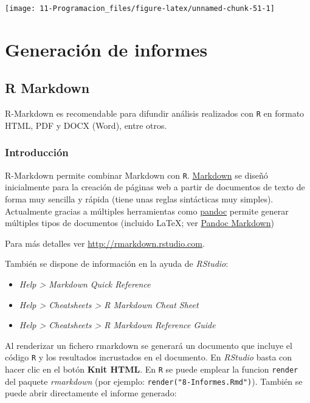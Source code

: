 \documentclass[]{book}
\begin{document}
\begin{center}\texttt{[image: 11-Programacion\_files/figure-latex/unnamed-chunk-51-1]} \end{center}

\hypertarget{generacion-de-informes}{%
\chapter{Generación de informes}\label{generacion-de-informes}}

\hypertarget{r-markdown}{%
\section{R Markdown}\label{r-markdown}}

R-Markdown es recomendable para difundir análisis realizados con \texttt{R} en formato HTML, PDF y DOCX (Word), entre otros.

\hypertarget{introduccion-1}{%
\subsection{Introducción}\label{introduccion-1}}

R-Markdown permite combinar Markdown con \texttt{R}. \href{http://daringfireball.net/projects/markdown/}{Markdown} se diseñó inicialmente para la creación de páginas web a partir de documentos de texto de forma muy sencilla y rápida (tiene unas reglas sintácticas muy simples). Actualmente gracias a múltiples herramientas como \href{http://pandoc.org/}{pandoc} permite generar múltiples tipos de documentos (incluido LaTeX; ver \href{http://rmarkdown.rstudio.com/authoring_pandoc_markdown.html}{Pandoc Markdown})

Para más detalles ver \url{http://rmarkdown.rstudio.com}.

También se dispone de información en la ayuda de \emph{RStudio}:

\begin{itemize}
\item
  \emph{Help \textgreater{} Markdown Quick Reference}
\item
  \emph{Help \textgreater{} Cheatsheets \textgreater{} R Markdown Cheat Sheet}
\item
  \emph{Help \textgreater{} Cheatsheets \textgreater{} R Markdown Reference Guide}
\end{itemize}

Al renderizar un fichero rmarkdown se generará un documento que incluye el código \texttt{R}
y los resultados incrustados en el documento.
En \emph{RStudio} basta con hacer clic en el botón \textbf{Knit HTML}.
En \texttt{R} se puede emplear la funcion \texttt{render} del paquete \emph{rmarkdown}
(por ejemplo: \texttt{render("8-Informes.Rmd")}).
También se puede abrir directamente el informe generado:
\end{document}
